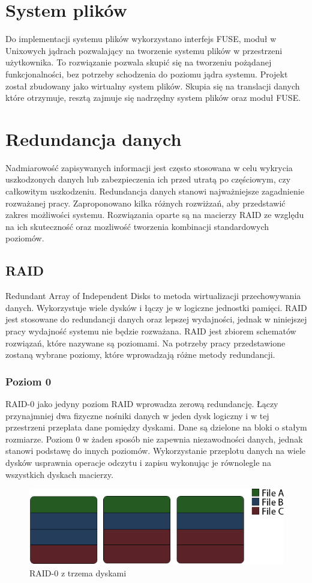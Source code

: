 \section{System plików}
Do implementacji systemu plików wykorzystano interfejs FUSE, moduł w Unixowych jądrach pozwalający na tworzenie systemu plików w przestrzeni użytkownika. To rozwiązanie pozwala skupić się na tworzeniu pożądanej funkcjonalności, bez potrzeby schodzenia do poziomu jądra systemu. Projekt został zbudowany jako wirtualny system plików. Skupia się na translacji danych które otrzymuje, resztą zajmuje się nadrzędny system plików oraz moduł FUSE. 

\section {Redundancja danych}
Nadmiarowość zapisywanych informacji jest często stosowana w celu wykrycia uszkodzonych danych lub zabezpieczenia ich przed utratą po częściowym, czy całkowitym uszkodzeniu.
Redundancja danych stanowi najważniejsze zagadnienie rozważanej pracy. Zaproponowano kilka różnych rozwiżzań, aby przedstawić zakres możliwości systemu. Rozwiązania oparte są na macierzy RAID ze względu na ich skuteczność oraz mozliwość tworzenia kombinacji standardowych poziomów.

\subsection {RAID}
Redundant Array of Independent Disks \cite{RAID1} to metoda wirtualizacji przechowywania danych. Wykorzystuje wiele dysków i łączy je w logiczne jednostki pamięci. RAID jest stosowane do redundancji danych oraz lepszej wydajności, jednak w niniejszej pracy wydajność systemu nie będzie rozważana.  
RAID jest zbiorem schematów rozwiązań, które nazywane są poziomami. Na potrzeby pracy przedstawione zostaną wybrane poziomy, które wprowadzają różne metody redundancji.
\subsubsection{Poziom 0}
RAID-0 jako jedyny poziom RAID wprowadza zerową redundancję. Łączy przynajmniej dwa fizyczne nośniki danych w jeden dysk logiczny i w tej przestrzeni przeplata dane pomiędzy dyskami. Dane są dzielone na bloki o stałym rozmiarze. Poziom 0 w żaden sposób nie zapewnia niezawodności danych, jednak stanowi podstawę do innych poziomów. Wykorzystanie przeplotu danych na wiele dysków usprawnia operacje odczytu i zapisu wykonując je równolegle na wszystkich dyskach macierzy.
\begin{figure}[h!]
        \centering
        \includegraphics[scale=0.8]{raid-0.png}
        \caption{RAID-0 z trzema dyskami}
        \label{fig:raid0}
\end{figure}
\newpage
